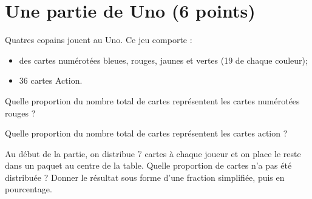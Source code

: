 \section{Une partie de Uno (6 points)}

Quatres copains jouent au Uno. Ce jeu comporte :

\begin{itemize}
	\item des cartes numérotées bleues, rouges, jaunes et vertes (19 de chaque couleur);
	\item 36 cartes Action.
\end{itemize}

\begin{questions}
	\question[2] Quelle proportion du nombre total de cartes représentent les cartes numérotées rouges ?
	
	\question[2] Quelle proportion du nombre total de cartes représentent les cartes action ?
	
	\question[2] Au début de la partie, on distribue 7 cartes à chaque joueur et on place le reste dans un paquet au centre de la table. Quelle proportion de cartes n'a pas été distribuée ? Donner le résultat sous forme d'une fraction simplifiée, puis en pourcentage.
\end{questions}